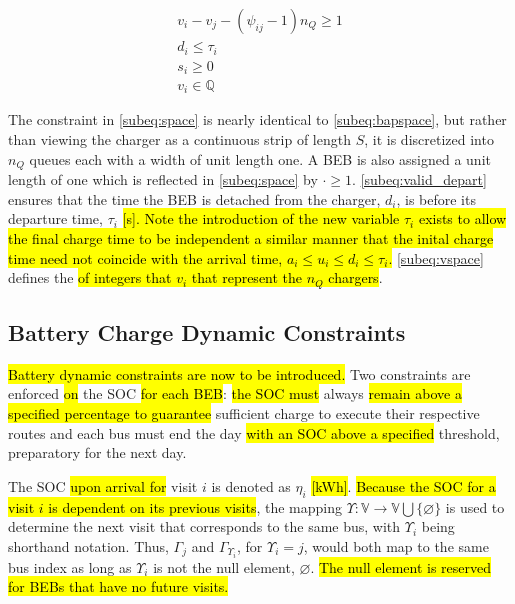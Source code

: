 \documentclass[utf8]{FrontiersinHarvard}
\begin{document}
\begin{subequations}
\label{eq:packconstrs}
\begin{align}
    v_i - v_j - (\psi_{ij} - 1)n_Q \geq 1 \label{subeq:space} \\ d_i \leq \tau_i \label{subeq:valid_depart} \\ s_i \geq
    0 \label{subeq:pos_charge} \\ v_i \in \mathbb{Q} \label{subeq:vspace}
\end{align}
\end{subequations}

The constraint in \autoref{subeq:space} is nearly identical to \autoref{subeq:bapspace}, but rather than viewing the
charger as a continuous strip of length \(S\), it is discretized into \(n_Q\) queues each with a width of unit length one. A
BEB is also assigned a unit length of one which is reflected in \autoref{subeq:space} by \(\cdot \geq 1\).
\autoref{subeq:valid_depart} ensures that the time the BEB is detached from the charger, \(d_i\), is before its departure
time, \(\tau_i\) \hl{[s]. Note the introduction of the new variable $\tau_i$ exists to allow the final charge time to be independent a similar manner that the inital charge time need not coincide with the arrival time, $a_i \le u_i \le d_i \le \tau_i$.} \autoref{subeq:vspace} defines the \hl{of integers that $v_i$ that represent the $n_Q$ chargers}.

\subsection{Battery Charge Dynamic Constraints}
\label{sec:batt_dynamics}
\hl{Battery dynamic constraints are now to be introduced.} Two constraints are enforced \hl{on}
the SOC \hl{for each BEB}: \hl{the SOC must} always \hl{remain above a specified percentage to guarantee} sufficient charge to execute their respective routes and each bus must end the day
\hl{with an SOC above a specified} threshold, preparatory for the next day.

The SOC \hl{upon arrival for} visit \(i\) is denoted as \(\eta_i\) \hl{[kWh]}. \hl{Because the SOC for a visit $i$ is dependent on its previous visits}, the mapping \(\Upsilon: \mathbb{V} \rightarrow \mathbb{V} \bigcup \{\varnothing\}\) is
used to determine the next visit that corresponds to the same bus, with \(\Upsilon_i\) being shorthand notation. Thus, \(\Gamma_j\) and
\(\Gamma_{\Upsilon_i}\), for \(\Upsilon_i = j\), would both map to the same bus index as long as \(\Upsilon_i\) is not the null element, \(\varnothing\).
\hl{The null element is reserved for BEBs that have no future visits.}
\end{document}

